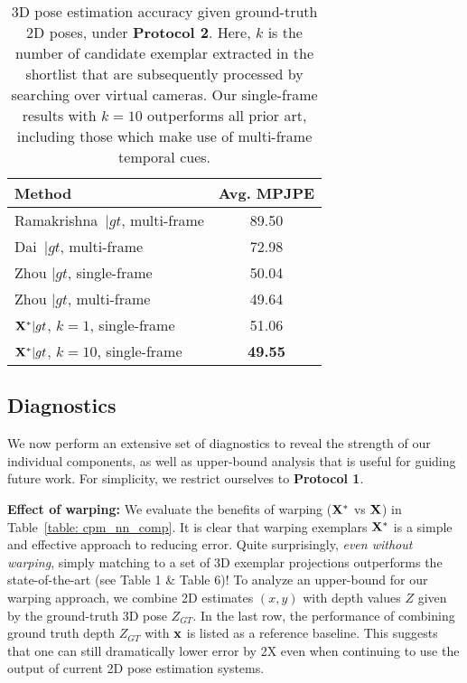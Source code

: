 \documentclass[10pt,twocolumn,letterpaper]{article}
\begin{document}
\begin{table}[t!]
\centering
\begin{tabular}{|l|c|}
\hline
Method  & Avg. MPJPE \\
\hline
\hline
Ramakrishna~\cite{ramakrishna2012reconstructing}$|gt$, multi-frame & 89.50\\
Dai~\cite{dai2014simple}$|gt$, multi-frame & 72.98\\
Zhou \cite{Zhou_2016_CVPR}$|gt$, single-frame & 50.04 \\
Zhou \cite{Zhou_2016_CVPR}$|gt$, multi-frame & 49.64 \\
\hline
${\bf X}^*|gt$, $k=1$, single-frame & 51.06 \\
${\bf X}^*|gt$, $k=10$, single-frame & {\bf 49.55} \\
\hline
\end{tabular}
\caption{3D pose estimation accuracy given ground-truth 2D poses, under {\bf Protocol 2}. Here, $k$ is the number of candidate exemplar extracted in the shortlist that are subsequently processed by searching over virtual cameras. Our single-frame results with $k=10$ outperforms all prior art, including those which make use of multi-frame temporal cues.}\label{table: procrus_compare}
\end{table}


\subsection{Diagnostics}
\label{exp1}

We now perform an extensive set of diagnostics to reveal the strength of our individual components, as well as upper-bound analysis that is useful for guiding future work. For simplicity, we restrict ourselves to \textbf{Protocol 1}.

{\bf Effect of warping:} We evaluate the benefits of warping (${\bf X}^*$ vs ${\bf X}$) in Table~\ref{table: cpm_nn_comp}. It is clear that warping exemplars ${\bf X}^*$ is a simple and effective approach to reducing error. Quite surprisingly, {\em even without warping}, simply matching to a set of 3D exemplar projections outperforms the state-of-the-art (see Table 1 \& Table 6)! To analyze an upper-bound for our warping approach, we combine 2D estimates $(x,y)$ with depth values $Z$ given by the ground-truth 3D pose $Z_{GT}$.
In the last row, the performance of combining ground truth depth $Z_{GT}$ with ${\bf x}$ is listed as a reference baseline. This suggests that one can still dramatically lower error by 2X even when continuing to use the output of current 2D pose estimation systems. 
\end{document}
